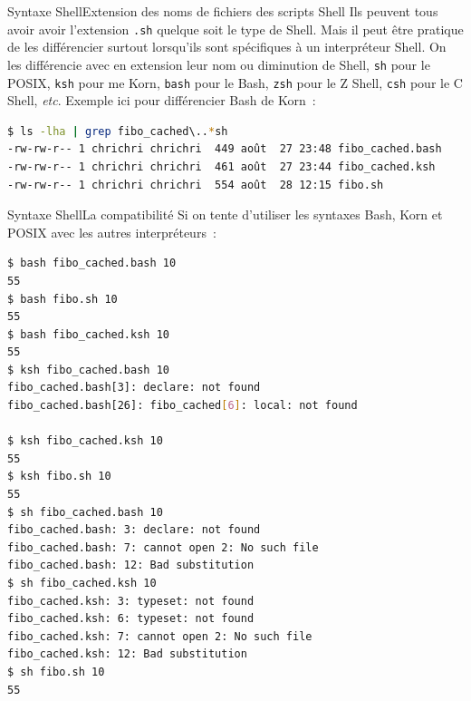 \documentclass{beamer}
\begin{document}
    \begin{frame}[fragile]{Syntaxe Shell}{Extension des noms de fichiers des scripts Shell}
        Ils peuvent tous avoir avoir l'extension \lstinline{.sh} quelque soit le type de Shell.
        \bigbreak
        Mais il peut être pratique de les différencier surtout lorsqu'ils sont spécifiques à un interpréteur Shell.
        On les différencie avec en extension leur nom ou diminution de Shell, \lstinline{sh} pour le POSIX, \lstinline{ksh} pour me Korn, \lstinline{bash} pour le Bash, \lstinline{zsh} pour le Z Shell, \lstinline{csh} pour le C Shell, \textit{etc}.
        \bigbreak
        Exemple ici pour différencier Bash de Korn~:
        \begin{lstlisting}[language=bash]
$ ls -lha | grep fibo_cached\..*sh
-rw-rw-r-- 1 chrichri chrichri  449 août  27 23:48 fibo_cached.bash
-rw-rw-r-- 1 chrichri chrichri  461 août  27 23:44 fibo_cached.ksh
-rw-rw-r-- 1 chrichri chrichri  554 août  28 12:15 fibo.sh
        \end{lstlisting}
    \end{frame}

    \begin{frame}[fragile]{Syntaxe Shell}{La compatibilité}
        Si on tente d'utiliser les syntaxes Bash, Korn et POSIX avec les autres interpréteurs~:
        \begin{lstlisting}[language=bash,basicstyle=\tiny\ttfamily]
$ bash fibo_cached.bash 10
55
$ bash fibo.sh 10
55
$ bash fibo_cached.ksh 10
55
$ ksh fibo_cached.bash 10
fibo_cached.bash[3]: declare: not found
fibo_cached.bash[26]: fibo_cached[6]: local: not found

$ ksh fibo_cached.ksh 10
55
$ ksh fibo.sh 10
55
$ sh fibo_cached.bash 10
fibo_cached.bash: 3: declare: not found
fibo_cached.bash: 7: cannot open 2: No such file
fibo_cached.bash: 12: Bad substitution
$ sh fibo_cached.ksh 10
fibo_cached.ksh: 3: typeset: not found
fibo_cached.ksh: 6: typeset: not found
fibo_cached.ksh: 7: cannot open 2: No such file
fibo_cached.ksh: 12: Bad substitution
$ sh fibo.sh 10
55
        \end{lstlisting}
    \end{frame}
\end{document}
